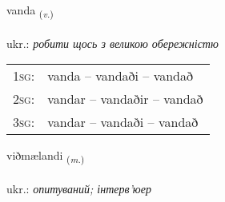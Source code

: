 \documentclass[frontgrid, backgrid]{flacards}\usepackage[]{graphicx}\usepackage[]{xcolor}
\begin{document}
\renewcommand{\blhead}{\vskip5pt {\small\bfseries\footnotesize Sagnorð | дієслово }}
\renewcommand{\bcfoot}{\vskip5pt \hspace{2pt}{\small\bfseries\footnotesize 3K}}


{vanda \small{\textsubscript{(\textit{v.})}} \\[1ex] %
\textphonetic{[vanta]} \\
ukr.: \emph{робити щось з великою обережністю} \\  [2ex]
\renewcommand*{\arraystretch}{0.8}
\begin{tabular}{p{1cm}l}
\textsc{1sg}: & vanda -- vandaði -- vandað \\ 
\textsc{2sg}: & vandar -- vandaðir -- vandað \\ 
\textsc{3sg}: & vandar -- vandaði -- vandað \\ 
\end{tabular}
}

\renewcommand{\flhead}{\vskip5pt \fboxsep=0pt {\small\bfseries\footnotesize Nafnorð | іменник}}
\renewcommand{\fcfoot}{\vskip5pt \fboxsep=0pt \hspace{2pt}{\small\bfseries\footnotesize 3K}}

\renewcommand{\blhead}{\vskip5pt {\small\bfseries\footnotesize Nafnorð | іменник }}
\renewcommand{\bcfoot}{\vskip5pt \hspace{2pt}{\small\bfseries\footnotesize 3K}}


{viðmælandi \small{\textsubscript{(\textit{m.})}} \\[1ex] %
\textphonetic{[vɪðmailantɪ]} \\
ukr.: \emph{опитуваний; інтерв'юер} \\  [2ex]
\renewcommand*{\arraystretch}{0.8}
}
\end{document}

